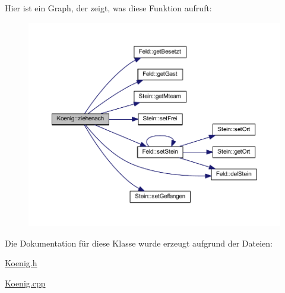 Hier ist ein Graph, der zeigt, was diese Funktion aufruft\+:\nopagebreak
\begin{figure}[H]
\begin{center}
\leavevmode
\includegraphics[width=350pt]{class_koenig_a6060e36b885b96aad97fa4c66646942f_cgraph}
\end{center}
\end{figure}




Die Dokumentation für diese Klasse wurde erzeugt aufgrund der Dateien\+:\begin{DoxyCompactItemize}
\item 
\hyperlink{_koenig_8h}{Koenig.\+h}\item 
\hyperlink{_koenig_8cpp}{Koenig.\+cpp}\end{DoxyCompactItemize}
